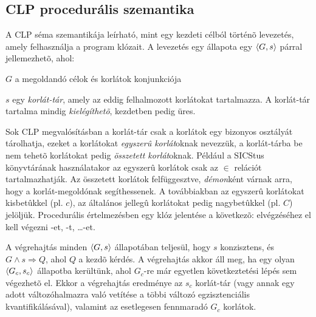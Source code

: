 \subsection{CLP procedurális szemantika}

A CLP séma szemantikája leírható, mint egy kezdeti célból történõ levezetés,
amely felhasználja a program klózait. A levezetés egy állapota egy
$\left\langle G,s\right\rangle$ párral jellemezhetõ, ahol:

\bul
\item $G$ a megoldandó célok és korlátok konjunkciója
\item $s$ egy \emph{korlát-tár}, amely az eddig felhalmozott korlátokat
tartalmazza. A korlát-tár tartalma mindig \emph{kielégíthetõ}, kezdetben
pedig üres.
\eul

Sok CLP megvalósításban a korlát-tár csak a korlátok egy bizonyos osztályát
tárolhatja, ezeket a korlátokat \emph{egyszerû korlát}oknak nevezzük,
a korlát-tárba be nem tehetõ korlátokat pedig \emph{összetett korlát}oknak.
Például a SICStus \clpfd könyvtárának használatakor az egyszerû korlátok csak az
$\in$ relációt tartalmazhatják. Az összetett korlátok felfüggesztve,
\emph{démon}ként várnak arra, hogy a korlát-megoldónak segíthessenek.
A továbbiakban az egyszerû korlátokat kisbetûkkel (pl. $c$), az általános
jellegû korlátokat pedig nagybetûkkel (pl. $C$) jelöljük.
\br
Procedurális értelmezésben egy  klóz jelentése
a következõ:  elvégzéséhez el kell végezni -et, -t,
\dots {}-et.

A végrehajtás minden $\left\langle G,s\right\rangle$ állapotában teljesül, hogy $s$ konzisztens,
és $G \land s \Rightarrow Q$, ahol $Q$ a kezdõ kérdés. A végrehajtás akkor áll meg, ha
egy olyan $\left\langle G_c,s_c\right\rangle$ állapotba kerültünk, ahol $G_c$-re már egyetlen
következtetési lépés sem végezhetõ el. Ekkor a végrehajtás eredménye az
$s_c$ korlát-tár (vagy annak egy adott változóhalmazra való vetítése
a többi változó egzisztenciális kvantifikálásával), valamint az esetlegesen
fennmaradó $G_c$ korlátok.

